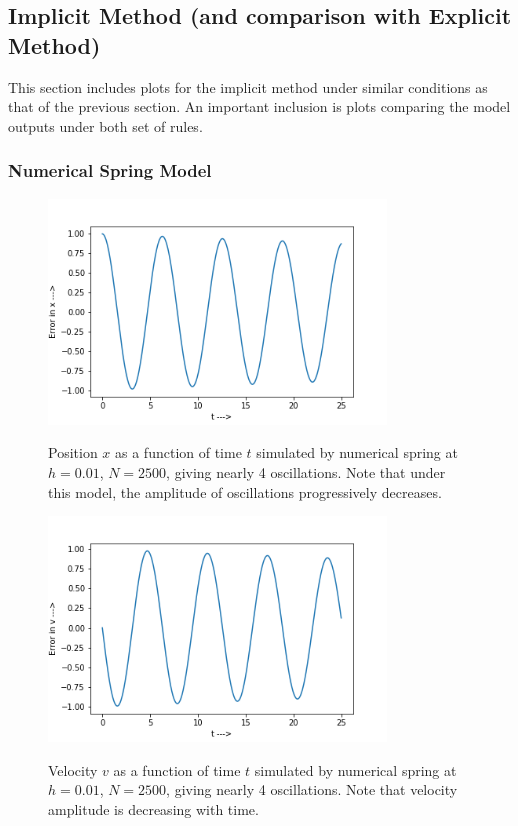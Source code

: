\documentclass{report}
\begin{document}
\subsection*{Implicit Method (and comparison with Explicit Method)}
This section includes plots for the implicit method under similar conditions as that of the previous section. An important inclusion is plots comparing the model outputs under both set of rules.
\subsubsection*{Numerical Spring Model}
\begin{figure}[H]
	\centering
	\includegraphics[width = 0.8\textwidth]{tXi.png}
	\label{tXi}
	\caption{Position $x$ as a function of time $t$ simulated by numerical spring at $h=0.01$, $N=2500$, giving nearly 4 oscillations. Note that under this model, the amplitude of oscillations progressively decreases.}
\end{figure}
\begin{figure}[H]
	\centering
	\includegraphics[width = 0.8\textwidth]{tVi.png}
	\label{tVi}
	\caption{Velocity $v$ as a function of time $t$ simulated by numerical spring at $h=0.01$, $N=2500$, giving nearly 4 oscillations. Note that velocity amplitude is decreasing with time.}
\end{figure}
\end{document}
